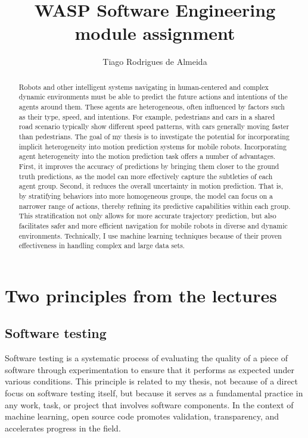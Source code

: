 \documentclass{article}
\title{WASP Software Engineering module assignment}
\author{Tiago Rodrigues de Almeida}
\begin{document}
\maketitle

\begin{abstract}
Robots and other intelligent systems navigating in human-centered and complex dynamic environments must be able to predict the future actions and intentions of the agents around them. These agents are heterogeneous, often influenced by factors such as their type, speed, and intentions. For example, pedestrians and cars in a shared road scenario typically show different speed patterns, with cars generally moving faster than pedestrians. The goal of my thesis is to investigate the potential for incorporating implicit heterogeneity into motion prediction systems for mobile robots. Incorporating agent heterogeneity into the motion prediction task offers a number of advantages.
First, it improves the accuracy of predictions by bringing them closer to the ground truth predictions, as the model can more effectively capture the subtleties of each agent group. Second, it reduces the overall uncertainty in motion prediction. That is, by stratifying behaviors into more homogeneous groups, the model can focus on a narrower range of actions, thereby refining its predictive capabilities within each group. This stratification not only allows for more accurate trajectory prediction, but also facilitates safer and more efficient navigation for mobile robots in diverse and dynamic environments. Technically, I use machine learning techniques because of their proven effectiveness in handling complex and large data sets.   
\end{abstract}

\section{Two principles from the lectures}

\subsection{Software testing}

Software testing is a systematic process of evaluating the quality of a piece of software through experimentation to ensure that it performs as expected under various conditions. This principle is related to my thesis, not because of a direct focus on software testing itself, but because it serves as a fundamental practice in any work, task, or project that involves software components. In the context of machine learning, open source code promotes validation, transparency, and accelerates progress in the field.
\end{document}

